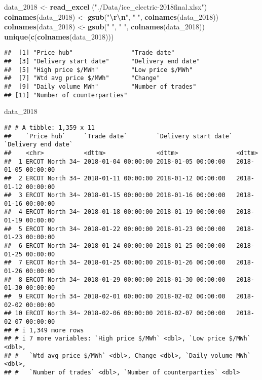 \documentclass[
]{article}
\newenvironment{Shaded}{\begin{snugshade}}{\end{snugshade}}
\newcommand{\FunctionTok}[1]{\textcolor[rgb]{0.13,0.29,0.53}{\textbf{#1}}}
\newcommand{\NormalTok}[1]{#1}
\newcommand{\OtherTok}[1]{\textcolor[rgb]{0.56,0.35,0.01}{#1}}
\newcommand{\SpecialCharTok}[1]{\textcolor[rgb]{0.81,0.36,0.00}{\textbf{#1}}}
\newcommand{\StringTok}[1]{\textcolor[rgb]{0.31,0.60,0.02}{#1}}
\begin{document}
\begin{Shaded}
\begin{Highlighting}[]
\NormalTok{data\_2018 }\OtherTok{\textless{}{-}} \FunctionTok{read\_excel}\NormalTok{ (}\StringTok{"./Data/ice\_electric{-}2018final.xlsx"}\NormalTok{)}
\FunctionTok{colnames}\NormalTok{(data\_2018) }\OtherTok{\textless{}{-}} \FunctionTok{gsub}\NormalTok{(}\StringTok{"}\SpecialCharTok{\textbackslash{}r\textbackslash{}n}\StringTok{"}\NormalTok{, }\StringTok{" "}\NormalTok{, }\FunctionTok{colnames}\NormalTok{(data\_2018))}
\FunctionTok{colnames}\NormalTok{(data\_2018) }\OtherTok{\textless{}{-}} \FunctionTok{gsub}\NormalTok{(}\StringTok{"  "}\NormalTok{, }\StringTok{" "}\NormalTok{, }\FunctionTok{colnames}\NormalTok{(data\_2018))}
\FunctionTok{unique}\NormalTok{(}\FunctionTok{c}\NormalTok{(}\FunctionTok{colnames}\NormalTok{(data\_2018)))}
\end{Highlighting}
\end{Shaded}

\begin{verbatim}
##  [1] "Price hub"                "Trade date"              
##  [3] "Delivery start date"      "Delivery end date"       
##  [5] "High price $/MWh"         "Low price $/MWh"         
##  [7] "Wtd avg price $/MWh"      "Change"                  
##  [9] "Daily volume MWh"         "Number of trades"        
## [11] "Number of counterparties"
\end{verbatim}

\begin{Shaded}
\begin{Highlighting}[]
\NormalTok{data\_2018}
\end{Highlighting}
\end{Shaded}

\begin{verbatim}
## # A tibble: 1,359 x 11
##    `Price hub`     `Trade date`        `Delivery start date` `Delivery end date`
##    <chr>           <dttm>              <dttm>                <dttm>             
##  1 ERCOT North 34~ 2018-01-04 00:00:00 2018-01-05 00:00:00   2018-01-05 00:00:00
##  2 ERCOT North 34~ 2018-01-11 00:00:00 2018-01-12 00:00:00   2018-01-12 00:00:00
##  3 ERCOT North 34~ 2018-01-15 00:00:00 2018-01-16 00:00:00   2018-01-16 00:00:00
##  4 ERCOT North 34~ 2018-01-18 00:00:00 2018-01-19 00:00:00   2018-01-19 00:00:00
##  5 ERCOT North 34~ 2018-01-22 00:00:00 2018-01-23 00:00:00   2018-01-23 00:00:00
##  6 ERCOT North 34~ 2018-01-24 00:00:00 2018-01-25 00:00:00   2018-01-25 00:00:00
##  7 ERCOT North 34~ 2018-01-25 00:00:00 2018-01-26 00:00:00   2018-01-26 00:00:00
##  8 ERCOT North 34~ 2018-01-29 00:00:00 2018-01-30 00:00:00   2018-01-30 00:00:00
##  9 ERCOT North 34~ 2018-02-01 00:00:00 2018-02-02 00:00:00   2018-02-02 00:00:00
## 10 ERCOT North 34~ 2018-02-06 00:00:00 2018-02-07 00:00:00   2018-02-07 00:00:00
## # i 1,349 more rows
## # i 7 more variables: `High price $/MWh` <dbl>, `Low price $/MWh` <dbl>,
## #   `Wtd avg price $/MWh` <dbl>, Change <dbl>, `Daily volume MWh` <dbl>,
## #   `Number of trades` <dbl>, `Number of counterparties` <dbl>
\end{verbatim}
\end{document}
